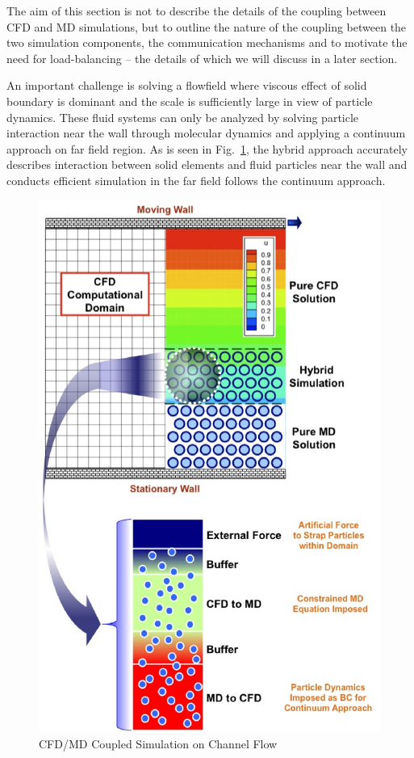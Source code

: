 \documentclass[conference,final]{IEEEtran}
\begin{document}
The aim of this section is not to describe the details of the coupling between CFD and MD 
simulations, but to outline the nature of the coupling between the two simulation 
components, the communication mechanisms and to motivate the need for load-balancing -- 
the details of which we will discuss in a later section.

An important challenge is solving a flowfield where viscous effect of solid boundary is 
dominant and the scale is sufficiently large in view of particle dynamics. These fluid 
systems can only be analyzed by solving particle interaction near the wall through 
molecular dynamics and applying a continuum approach on far field region. As is seen in 
Fig.~\ref{Fig:Couette}, the hybrid approach accurately describes interaction between 
solid elements and fluid particles near the wall and conducts efficient simulation in the 
far field follows the continuum approach.

\begin{figure}
\centering
\includegraphics[scale=0.45]{fig1.eps}
\caption{\small CFD/MD Coupled Simulation on Channel Flow}
\label{Fig:Couette}
\end{figure}
\end{document}
